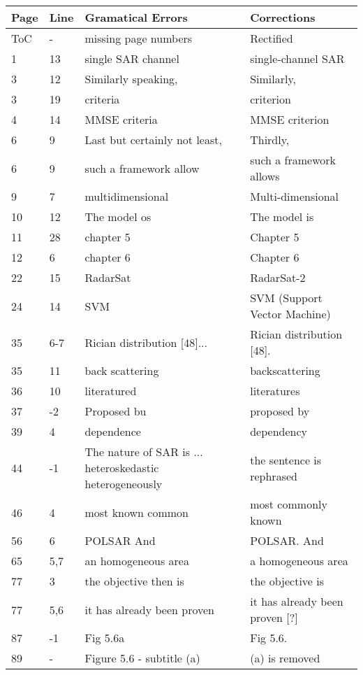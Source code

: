     
\noindent
\begin{longtable}[c]{p{}|p{}|p{}|p{}}
\textbf{Page} & \textbf{Line} & \textbf{Gramatical Errors} & \textbf{Corrections} \\
 \hline
 \endhead
ToC & - & missing page numbers & Rectified \\
1 & 13 & single SAR channel & single-channel SAR \\ 
3 & 12 & Similarly speaking, & Similarly, \\
3 & 19 & criteria & criterion \\ 
4 & 14 & MMSE criteria & MMSE criterion \\
6 & 9 & Last but certainly not least, & Thirdly, \\ 
6 & 9 & such a framework allow & such a framework allows \\
9 & 7 & multidimensional & Multi-dimensional \\
10 & 12 & The model os & The model is \\
11 & 28 & chapter 5 & Chapter 5 \\
12 & 6 & chapter 6 & Chapter 6 \\
22 & 15 & RadarSat & RadarSat-2 \\
24 & 14 & SVM & SVM (Support Vector Machine) \\
35 & 6-7 & Rician distribution [48]... & Rician distribution [48]. \\
35 & 11 & back scattering & backscattering \\
36 & 10 & literatured & literatures \\
37 & -2 & Proposed bu & proposed by \\
39 & 4 & dependence & dependency \\
44 & -1 & The nature of SAR is ... heteroskedastic heterogeneously & the sentence is rephrased \\
46 & 4 & most known common & most commonly known \\
56 & 6 & POLSAR And & POLSAR. And \\
65 &5,7 & an homogeneous area & a homogeneous area \\
77 & 3 & the objective then is & the objective is \\
77 & 5,6 & it has already been proven & it has already been proven [?] \\
87 & -1 & Fig 5.6a & Fig 5.6. \\
89 & - & Figure 5.6 - subtitle (a) & (a) is removed \\

\end{longtable}
